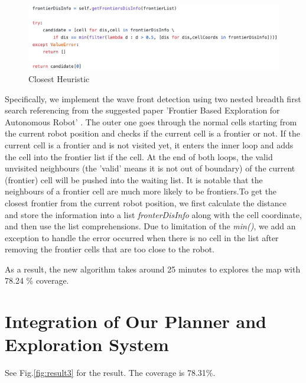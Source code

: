 \documentclass{article}
\begin{document}
\begin{figure}[ht]
\centering
\includegraphics[scale=0.5]{graphs/part2-3/closest.png}
\caption{Closest Heuristic}
\label{fig:closestHeuristic}
\end{figure}

Specifically, we implement the wave front detection using two nested breadth first search referencing from the suggested paper 'Frontier Based Exploration for Autonomous Robot' \cite{WFD}. The outer one goes through the normal cells starting from the current robot position and checks if the current cell is a frontier or not. If the current cell is a frontier and is not visited yet, it enters the inner loop and adds the cell into the frontier list if the cell. At the end of both loops, the valid unvisited neighbours (the 'valid' means it is not out of boundary) of the current (frontier) cell will be pushed into the waiting list. It is notable that the neighbours of a frontier cell are much more likely to be frontiers.To get the closest frontier from the current robot position, we first calculate the distance and store the information into a list \textit{fronterDisInfo} along with the cell coordinate, and then use the list comprehensions. Due to limitation of the \textit{min()}, we add an exception to handle the error occurred when there is no cell in the list after removing the frontier cells that are too close to the robot. 

As a result, the new algorithm takes around 25 minutes to explores the map with 78.24 \% coverage. 

\section{Integration of Our Planner and Exploration System}

See Fig.\ref{fig:result3} for the result. The coverage is  78.31\%.
\end{document}
